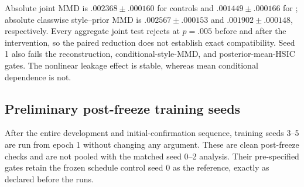 \begin{table}[ht]
\caption{Matched control/\FACT{} confirmation.  Semantic $\Delta$ is in
percentage points; reconstruction and reductions are relative percentages.
MLP shows control $\rightarrow$ \FACT{}.  HSIC $\downarrow<0$ denotes a
worsening.  Every training seed is retained.}
\label{tab:fact-seeds}
\centering
\scriptsize
\setlength{\tabcolsep}{3.2pt}
\end{table}

Absolute joint MMD is $.002368\pm.000160$ for controls and
$.001449\pm.000166$ for \FACT{}; absolute classwise style--prior MMD is
$.002567\pm.000153$ and $.001902\pm.000148$, respectively.  Every aggregate
joint test rejects at $p=.005$ before and after the intervention, so the paired
reduction does not establish exact compatibility.  Seed 1 also fails the
reconstruction, conditional-style-MMD, and posterior-mean-HSIC gates.  The
nonlinear leakage effect is stable, whereas mean conditional dependence is not.

\subsection{Preliminary post-freeze training seeds}

After the entire development and initial-confirmation sequence, training seeds
3--5 are run from epoch 1 without changing any argument.  These are clean
post-freeze checks and are not pooled with the matched seed 0--2 analysis.
Their pre-specified gates retain the frozen schedule
control seed 0 as the reference, exactly as declared before the runs.

